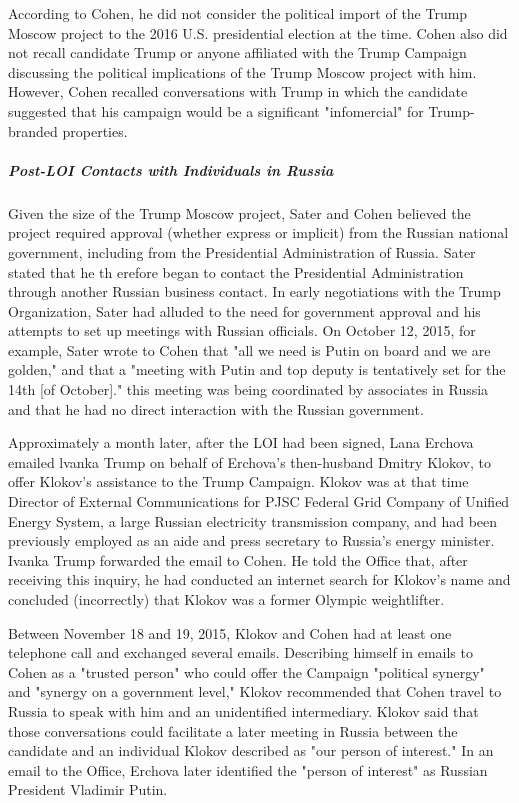 According to Cohen, he did not consider the political import of the Trump Moscow project to the 2016 U.S. presidential election at the time.
Cohen also did not recall candidate Trump or anyone affiliated with the Trump Campaign discussing the political implications of the Trump Moscow project with him.
However, Cohen recalled conversations with Trump in which the candidate suggested that his campaign would be a significant "infomercial" for Trump-branded properties.

\subparagraph{Post-LOI Contacts with Individuals in Russia}

Given the size of the Trump Moscow project, Sater and Cohen believed the project required approval (whether express or implicit) from the Russian national government, including from the Presidential Administration of Russia.
Sater stated that he th erefore began to contact the Presidential Administration through another Russian business contact.
In early negotiations with the Trump Organization, Sater had alluded to the need for government approval and his attempts to set up meetings with Russian officials.
On October 12, 2015, for example, Sater wrote to Cohen that "all we need is Putin on board and we are golden," and that a "meeting with Putin and top deputy is tentatively set for the 14th [of October]."
 this meeting was being coordinated by associates in Russia and that he had no direct interaction with the Russian government.

Approximately a month later, after the LOI had been signed, Lana Erchova emailed lvanka Trump on behalf of Erchova's then-husband Dmitry Klokov, to offer Klokov's assistance to the Trump Campaign.
Klokov was at that time Director of External Communications for PJSC Federal Grid Company of Unified Energy System, a large Russian electricity transmission company, and had been previously employed as an aide and press secretary to Russia's energy minister.
Ivanka Trump forwarded the email to Cohen.
He told the Office that, after receiving this inquiry, he had conducted an internet search for Klokov's name and concluded (incorrectly) that Klokov was a former Olympic weightlifter.

Between November 18 and 19, 2015, Klokov and Cohen had at least one telephone call and exchanged several emails.
Describing himself in emails to Cohen as a "trusted person" who could offer the Campaign "political synergy" and "synergy on a government level," Klokov recommended that Cohen travel to Russia to speak with him and an unidentified intermediary.
Klokov said that those conversations could facilitate a later meeting in Russia between the candidate and an individual Klokov described as "our person of interest."
In an email to the Office, Erchova later identified the "person of interest" as Russian President Vladimir Putin.

